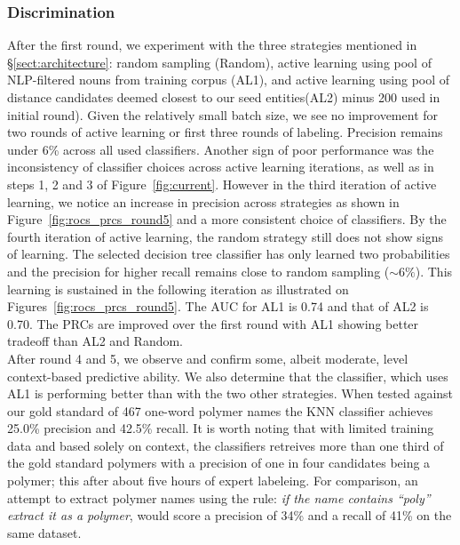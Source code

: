 \subsubsection{Discrimination}
After the first round, we experiment with the three strategies mentioned in \S\ref{sect:architecture}: random sampling (Random), active learning using pool of NLP-filtered nouns from training corpus (AL1), and active learning using pool of  distance candidates deemed closest to our seed entities(AL2) \textemdash minus 200 used in initial round).
Given the relatively small batch size, we see no improvement for two rounds of active learning or first three rounds of labeling. 
Precision remains under 6\% across all used classifiers. 
Another sign of poor performance was the inconsistency of classifier choices across active learning iterations, 
as well as in steps 1, 2 and 3 of Figure~\ref{fig:current}.
However in the third iteration of active learning, we notice an increase in precision across strategies as shown in Figure~\ref{fig:rocs_prcs_round5} and a more consistent choice of classifiers.
By the fourth iteration of active learning, the random strategy still does not show signs of learning. 
The selected decision tree classifier has only learned two probabilities and the precision for higher recall remains close to random sampling ($\sim 6\%$).
This learning is sustained in the following iteration as illustrated on Figures~\ref{fig:rocs_prcs_round5}. 
The AUC for AL1 is 0.74 and that of AL2 is 0.70. The PRCs are improved over the first round with AL1 showing better tradeoff than AL2 and Random.\\


After round 4 and 5,  we observe and confirm some, albeit moderate, level context-based predictive ability.
We also determine that the classifier, which uses AL1 is performing better than with the two other strategies.
When tested against our gold standard of 467 one-word polymer names the KNN classifier achieves 25.0\% precision and  42.5\% recall. 
It is worth noting that with limited training data and based solely on context, the classifiers retreives more than one third of the gold standard polymers with a precision of one in four candidates being a polymer; this after about five hours of expert labeleing. 
For comparison, an attempt to extract polymer names using the rule: \textit{if the name contains ``poly'' extract it as a polymer}, would score a precision of 34\% and a recall of 41\% on the same dataset.


